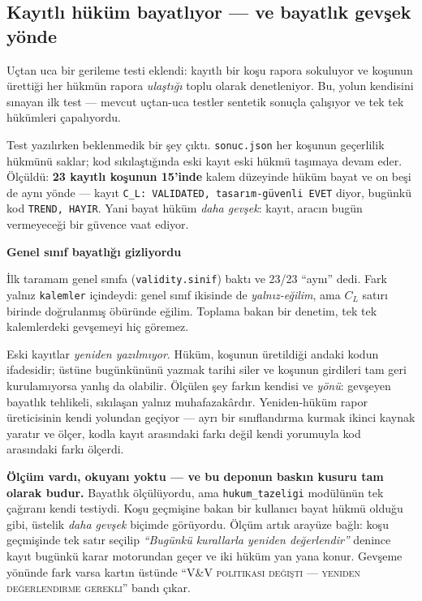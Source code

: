 \documentclass[11pt,a4paper]{article}
\newcommand{\kkkenar}{lacivert}
\newcommand{\kkzemin}{kod}
\newenvironment{renkkutu}[3]{%
  \renewcommand{\kkkenar}{#1}\renewcommand{\kkzemin}{#2}%
  \par\medskip\noindent
  \begin{lrbox}{\kutugovde}%
  \begin{minipage}{\dimexpr\linewidth-2\fboxsep-2\fboxrule\relax}\footnotesize
  \textcolor{#1}{\textbf{#3}}\par\vspace{3pt}%
}{%
  \end{minipage}%
  \end{lrbox}%
  \noindent\fcolorbox{\kkkenar}{\kkzemin}{\usebox{\kutugovde}}%
  \par\medskip
}
\newenvironment{dikkat}[1]{\begin{renkkutu}{orta}{ortabg}{#1}}{\end{renkkutu}}
\begin{document}
\subsection{Kayıtlı hüküm bayatlıyor --- ve bayatlık gevşek yönde}
\label{sub:hukum-tazeligi}

Uçtan uca bir gerileme testi eklendi: kayıtlı bir koşu rapora sokuluyor ve
koşunun ürettiği her hükmün rapora \emph{ulaştığı} toplu olarak denetleniyor.
Bu, yolun kendisini sınayan ilk test --- mevcut uçtan-uca testler sentetik
sonuçla çalışıyor ve tek tek hükümleri çapalıyordu.

Test yazılırken beklenmedik bir şey çıktı. \texttt{sonuc.json} her koşunun
geçerlilik hükmünü saklar; kod sıkılaştığında eski kayıt eski hükmü taşımaya
devam eder. Ölçüldü: \textbf{23 kayıtlı koşunun 15'inde} kalem düzeyinde
hüküm bayat ve on beşi de aynı yönde --- kayıt
\texttt{C\_L: VALIDATED, tasarım-güvenli EVET} diyor, bugünkü kod
\texttt{TREND, HAYIR}. Yani bayat hüküm \emph{daha gevşek}: kayıt, aracın
bugün vermeyeceği bir güvence vaat ediyor.

\begin{dikkat}{Genel sınıf bayatlığı gizliyordu}
İlk taramam genel sınıfa (\texttt{validity.sinif}) baktı ve 23/23 ``aynı''
dedi. Fark yalnız \texttt{kalemler} içindeydi: genel sınıf ikisinde de
\emph{yalnız-eğilim}, ama $C_L$ satırı birinde doğrulanmış öbüründe eğilim.
Toplama bakan bir denetim, tek tek kalemlerdeki gevşemeyi hiç göremez.
\end{dikkat}

\noindent Eski kayıtlar \emph{yeniden yazılmıyor}. Hüküm, koşunun üretildiği
andaki kodun ifadesidir; üstüne bugünkününü yazmak tarihi siler ve koşunun
girdileri tam geri kurulamıyorsa yanlış da olabilir. Ölçülen şey farkın
kendisi ve \emph{yönü}: gevşeyen bayatlık tehlikeli, sıkılaşan yalnız
muhafazakârdır. Yeniden-hüküm rapor üreticisinin kendi yolundan geçiyor ---
ayrı bir sınıflandırma kurmak ikinci kaynak yaratır ve ölçer, kodla kayıt
arasındaki farkı değil kendi yorumuyla kod arasındaki farkı ölçerdi.

\medskip
\noindent \textbf{Ölçüm vardı, okuyanı yoktu --- ve bu deponun baskın
kusuru tam olarak budur.} Bayatlık ölçülüyordu, ama
\texttt{hukum\_tazeligi} modülünün tek çağıranı kendi testiydi. Koşu
geçmişine bakan bir kullanıcı bayat hükmü olduğu gibi, üstelik
\emph{daha gevşek} biçimde görüyordu. Ölçüm artık arayüze bağlı: koşu
geçmişinde tek satır seçilip \emph{``Bugünkü kurallarla yeniden
değerlendir''} denince kayıt bugünkü karar motorundan geçer ve iki hüküm
yan yana konur. Gevşeme yönünde fark varsa kartın üstünde
``\textsc{V\&V politikası değişti --- yeniden değerlendirme gerekli}''
bandı çıkar.
\end{document}
